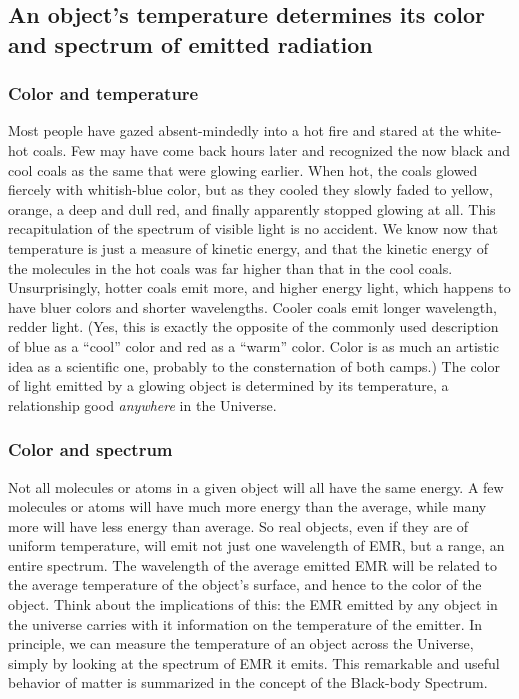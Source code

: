 \documentclass[amstex,12pt]{book}
\begin{document}
\subsection{An object's temperature determines its color and spectrum of emitted radiation}
\subsubsection{Color and temperature}
Most people have gazed absent-mindedly into a hot fire and stared at the white-hot coals. Few may have come back hours later and recognized the now black and cool coals as the same that were glowing earlier. When hot, the coals glowed fiercely with whitish-blue color, but as they cooled they slowly faded to yellow, orange, a deep and dull red, and finally apparently stopped glowing at all. This recapitulation of the spectrum of visible light is no accident. We know now that temperature is just a measure of kinetic energy, and that the kinetic energy of the molecules in the hot coals was far higher than that in the cool coals. Unsurprisingly, hotter coals emit more, and higher energy light, which happens to have bluer colors and shorter wavelengths. Cooler coals emit longer wavelength, redder light. (Yes, this is exactly the opposite of the commonly used description of blue as a ``cool'' color and red as a ``warm'' color. Color is as much an artistic idea as a scientific one, probably to the consternation of both camps.) The color of light emitted by a glowing object is determined by its temperature, a relationship good \emph{anywhere} in the Universe. 

\subsubsection{Color and spectrum}
Not all molecules or atoms in a given object will all have the same energy. A few molecules or atoms will have much more energy than the average, while many more will have less energy than average. So real objects, even if they are of uniform temperature, will emit not just one wavelength of EMR, but a range, an entire spectrum. The wavelength of the average emitted EMR will be related to the average temperature of the object's surface, and hence to the color of the object. Think about the implications of this: the EMR emitted by any object in the universe carries with it information on the temperature of the emitter. In principle, we can measure the temperature of an object across the Universe, simply by looking at the spectrum of EMR it emits. This remarkable and useful behavior of matter is summarized in the concept of the Black-body Spectrum.
\end{document}
